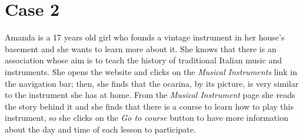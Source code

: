 \documentclass[../../DD.tex]{subfiles}
\begin{document}
\section{Case 2}

	Amanda is a 17 years old girl who founds a vintage instrument in her house's basement and she wants to learn more about it. She knows that there is an association whose aim is to teach the history of traditional Italian music and instruments.
	\newline She opens the website and clicks on the \textit{Musical Instruments} link in the navigation bar; then, she finds that the ocarina, by its picture, is very similar to the instrument she has at home.
	From the \textit{Musical Instrument} page she reads the story behind it and she finds that there is a course to learn how to play this instrument, so she clicks on the \textit{Go to course} button to have more information about the day and time of each lesson to participate.
	
\end{document}
